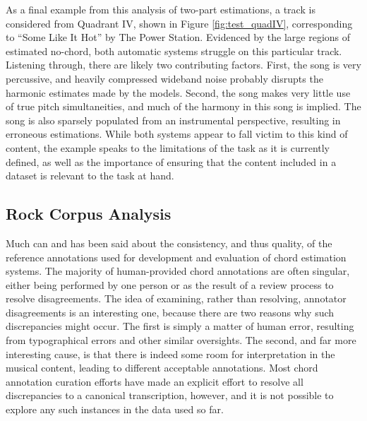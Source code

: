 As a final example from this analysis of two-part estimations, a track is considered from Quadrant IV, shown in Figure \ref{fig:test_quadIV}, corresponding to ``Some Like It Hot'' by The Power Station.
Evidenced by the large regions of estimated no-chord, both automatic systems struggle on this particular track.
Listening through, there are likely two contributing factors.
First, the song is very percussive, and heavily compressed wideband noise probably disrupts the harmonic estimates made by the models.
Second, the song makes very little use of true pitch simultaneities, and much of the harmony in this song is implied.
The song is also sparsely populated from an instrumental perspective, resulting in erroneous estimations.
While both systems appear to fall victim to this kind of content, the example speaks to the limitations of the task as it is currently defined, as well as the importance of ensuring that the content included in a dataset is relevant to the task at hand.


\subsection{Rock Corpus Analysis}
\label{subsec:qualitative_analysis}

Much can and has been said about the consistency, and thus quality, of the reference annotations used for development and evaluation of chord estimation systems.
The majority of human-provided chord annotations are often singular, either being performed by one person or as the result of a review process to resolve disagreements.
The idea of examining, rather than resolving, annotator disagreements is an interesting one, because there are two reasons why such discrepancies might occur.
The first is simply a matter of human error, resulting from typographical errors and other similar oversights.
The second, and far more interesting cause, is that there is indeed some room for interpretation in the musical content, leading to different acceptable annotations.
Most chord annotation curation efforts have made an explicit effort to resolve all discrepancies to a canonical transcription, however, and it is not possible to explore any such instances in the data used so far.



